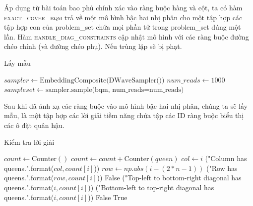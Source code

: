 Áp dụng từ bài toán bao phủ chính xác vào ràng buộc hàng và cột, ta có hàm \textsc{exact\_cover\_bqm} trả về một mô hình bậc hai nhị phân cho một tập hợp các tập hợp con của problem\_set chứa mọi phần tử trong problem\_set đúng một lần. Hàm \textsc{handle\_diag\_constraints} cập nhật mô hình với các ràng buộc đường chéo chính (và đường chéo phụ). Nếu trùng lặp sẽ bị phạt.

\begin{algorithm}[H]
	\caption{Lấy mẫu}
	\begin{algorithmic}[1]
		
		\State $sampler \gets \text{EmbeddingComposite(DWaveSampler())}$
		\State $num\_reads \gets 1000$
		\State $sampleset \gets \text{sampler.sample(bqm, num\_reads=num\_reads)}$
		
	\end{algorithmic}
	
\end{algorithm}

Sau khi đã ánh xạ các ràng buộc vào mô hình bậc hai nhị phân, chúng ta sẽ lấy mẫu, là một tập hợp các lời giải tiềm năng chứa tập các ID ràng buộc biểu thị các ô đặt quân hậu.

\begin{algorithm}[H]
    \caption{Kiểm tra lời giải}
    \begin{algorithmic}[1]
            \State $count \gets \text{Counter}()$
                \State $count \gets count + \text{Counter}(queen)$
            \EndFor
                        \State $col \gets i$
                        \State {}("Column {} has {} queens.".format($col, count[i]$))
                    \Else
                        \State $row \gets np.abs(i - (2*n - 1))$ %
                        \State {}("Row {} has {} queens.".format($row, count[i]$))
                    \EndIf
                    \State \Return False
                \EndIf
            \EndFor
                        \State {}("Top-left to bottom-right diagonal {} has {} queens.".format($i, count[i]$))
                    \Else
                        \State {}("Bottom-left to top-right diagonal {} has {} queens.".format($i, count[i]$))
                    \EndIf
                    \State \Return False
                \EndIf
            \EndFor
            \State \Return True
        \EndFunction
    \end{algorithmic}
\end{algorithm}
    
